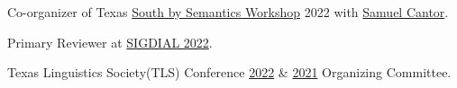Co-organizer of Texas \href{https://sites.google.com/utexas.edu/sxsw}{South by Semantics Workshop} 2022 with \href{https://www.cantwolf.com}{Samuel Cantor}.

Primary Reviewer at \href{https://2022.sigdial.org}{SIGDIAL 2022}.

Texas Linguistics Society(TLS) Conference \href{http://tls.ling.utexas.edu/2022/}{2022} \& \href{http://tls.ling.utexas.edu/2021/}{2021} Organizing Committee.
